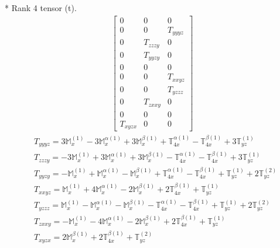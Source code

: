 \documentclass[fleqn,8pt,landscape]{jsarticle}
\begin{document}
* Rank 4 tensor (t).
\begin{align*}
\begin{bmatrix} 0 & 0 & 0 \\ 0 & 0 & T_{yyyz} \\ 0 & T_{zzzy} & 0 \\ 0 & T_{yyzy} & 0 \\ 0 & 0 & 0 \\ 0 & 0 & T_{xxyz} \\ 0 & 0 & T_{yzzz} \\ 0 & T_{zxxy} & 0 \\ 0 & 0 & 0 \\ T_{xyzx} & 0 & 0 \end{bmatrix}
\end{align*}
\begin{align*}
& T_{yyyz} = 3 \mathbb{M}_{x}^{(1)} - 3 \mathbb{M}_{x}^{\alpha(1)} + 3 \mathbb{M}_{x}^{\beta(1)} + \mathbb{T}_{4x}^{\alpha(1)} - \mathbb{T}_{4x}^{\beta(1)} + 3 \mathbb{T}_{yz}^{(1)} \\
& T_{zzzy} = - 3 \mathbb{M}_{x}^{(1)} + 3 \mathbb{M}_{x}^{\alpha(1)} + 3 \mathbb{M}_{x}^{\beta(1)} - \mathbb{T}_{4x}^{\alpha(1)} - \mathbb{T}_{4x}^{\beta(1)} + 3 \mathbb{T}_{yz}^{(1)} \\
& T_{yyzy} = - \mathbb{M}_{x}^{(1)} + \mathbb{M}_{x}^{\alpha(1)} - \mathbb{M}_{x}^{\beta(1)} + \mathbb{T}_{4x}^{\alpha(1)} - \mathbb{T}_{4x}^{\beta(1)} + \mathbb{T}_{yz}^{(1)} + 2 \mathbb{T}_{yz}^{(2)} \\
& T_{xxyz} = \mathbb{M}_{x}^{(1)} + 4 \mathbb{M}_{x}^{\alpha(1)} - 2 \mathbb{M}_{x}^{\beta(1)} + 2 \mathbb{T}_{4x}^{\beta(1)} + \mathbb{T}_{yz}^{(1)} \\
& T_{yzzz} = \mathbb{M}_{x}^{(1)} - \mathbb{M}_{x}^{\alpha(1)} - \mathbb{M}_{x}^{\beta(1)} - \mathbb{T}_{4x}^{\alpha(1)} - \mathbb{T}_{4x}^{\beta(1)} + \mathbb{T}_{yz}^{(1)} + 2 \mathbb{T}_{yz}^{(2)} \\
& T_{zxxy} = - \mathbb{M}_{x}^{(1)} - 4 \mathbb{M}_{x}^{\alpha(1)} - 2 \mathbb{M}_{x}^{\beta(1)} + 2 \mathbb{T}_{4x}^{\beta(1)} + \mathbb{T}_{yz}^{(1)} \\
& T_{xyzx} = 2 \mathbb{M}_{x}^{\beta(1)} + 2 \mathbb{T}_{4x}^{\beta(1)} + \mathbb{T}_{yz}^{(2)}
\end{align*}
\end{document}

